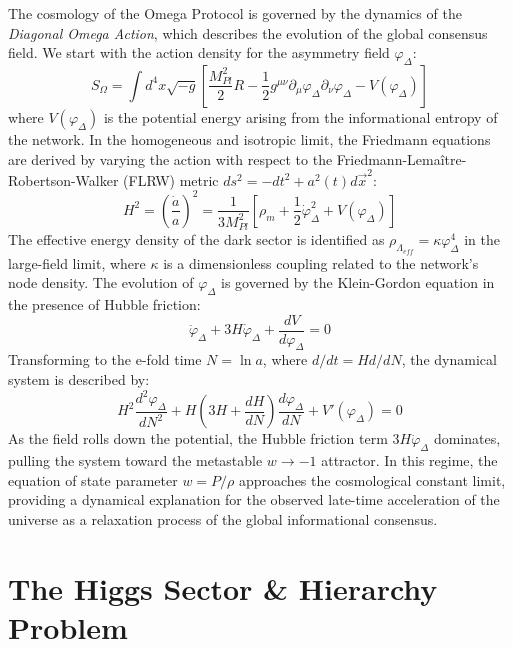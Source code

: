 \documentclass[11pt,template]{article}
\newcommand{\MPl}{M_{Pl}}
\begin{document}
The cosmology of the Omega Protocol is governed by the dynamics of the \textit{Diagonal Omega Action}, which describes the evolution of the global consensus field. We start with the action density for the asymmetry field $\varphi_\Delta$:
\begin{equation}
    S_\Omega = \int d^4x \sqrt{-g} \left[ \frac{\MPl^2}{2} R - \frac{1}{2} g^{\mu\nu} \partial_\mu \varphi_\Delta \partial_\nu \varphi_\Delta - V(\varphi_\Delta) \right]
\end{equation}
where $V(\varphi_\Delta)$ is the potential energy arising from the informational entropy of the network. In the homogeneous and isotropic limit, the Friedmann equations are derived by varying the action with respect to the Friedmann-Lemaître-Robertson-Walker (FLRW) metric $ds^2 = -dt^2 + a^2(t) d\vec{x}^2$:
\begin{equation}
    H^2 = \left(\frac{\dot{a}}{a}\right)^2 = \frac{1}{3\MPl^2} \left[ \rho_m + \frac{1}{2}\dot{\varphi}_\Delta^2 + V(\varphi_\Delta) \right]
\end{equation}
The effective energy density of the dark sector is identified as $\rho_{\Lambda_{eff}} = \kappa \varphi_\Delta^4$ in the large-field limit, where $\kappa$ is a dimensionless coupling related to the network's node density. The evolution of $\varphi_\Delta$ is governed by the Klein-Gordon equation in the presence of Hubble friction:
\begin{equation}
    \ddot{\varphi}_\Delta + 3H \dot{\varphi}_\Delta + \frac{dV}{d\varphi_\Delta} = 0
\end{equation}
Transforming to the e-fold time $N = \ln a$, where $d/dt = H d/dN$, the dynamical system is described by:
\begin{equation}
    H^2 \frac{d^2\varphi_\Delta}{dN^2} + H \left( 3H + \frac{dH}{dN} \right) \frac{d\varphi_\Delta}{dN} + V'(\varphi_\Delta) = 0
\end{equation}
As the field rolls down the potential, the Hubble friction term $3H \dot{\varphi}_\Delta$ dominates, pulling the system toward the metastable $w \to -1$ attractor. In this regime, the equation of state parameter $w = P/\rho$ approaches the cosmological constant limit, providing a dynamical explanation for the observed late-time acceleration of the universe as a relaxation process of the global informational consensus.

\section{The Higgs Sector \& Hierarchy Problem}
\end{document}
